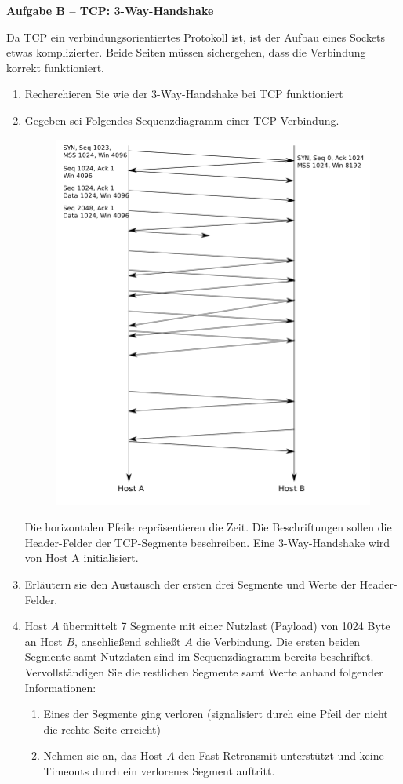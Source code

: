 \documentclass[paper=a4,fontsize=11pt]{scrartcl}%
\numberwithin{equation}{section}
\begin{document}
\begin{center}\Large{\textbf{Aufgabe B -- TCP: 3-Way-Handshake}}\end{center}\vskip0.2in
Da TCP ein verbindungsorientiertes Protokoll ist, ist der Aufbau eines Sockets etwas komplizierter. Beide Seiten müssen sichergehen, dass die Verbindung korrekt funktioniert.
\begin{enumerate}
	\item Recherchieren Sie wie der 3-Way-Handshake bei TCP funktioniert \cite[Kap. 3.5]{Kurose2012}
	\item Gegeben sei Folgendes Sequenzdiagramm einer TCP Verbindung.
	\begin{figure}[H]
		\centering
		\includegraphics[scale=0.3]{handshake}
	\end{figure}
	Die horizontalen Pfeile repräsentieren die Zeit. Die Beschriftungen sollen die Header-Felder der TCP-Segmente beschreiben. Eine 3-Way-Handshake wird von Host A initialisiert.
	\item Erläutern sie den Austausch der ersten drei Segmente und Werte der Header-Felder.
	\item Host $A$ übermittelt 7 Segmente mit einer Nutzlast (Payload) von 1024 Byte an Host $B$, anschließend schließt $A$ die Verbindung. Die ersten beiden Segmente samt Nutzdaten sind im Sequenzdiagramm bereits beschriftet. Vervollständigen Sie die restlichen Segmente samt Werte anhand folgender Informationen:
	\begin{enumerate}
		\item Eines der Segmente ging verloren (signalisiert durch eine Pfeil der nicht die rechte Seite erreicht)
		\item Nehmen sie an, das Host $A$ den Fast-Retransmit unterstützt und keine Timeouts durch ein verlorenes Segment auftritt.
	\end{enumerate}
\end{enumerate}
\end{document}
